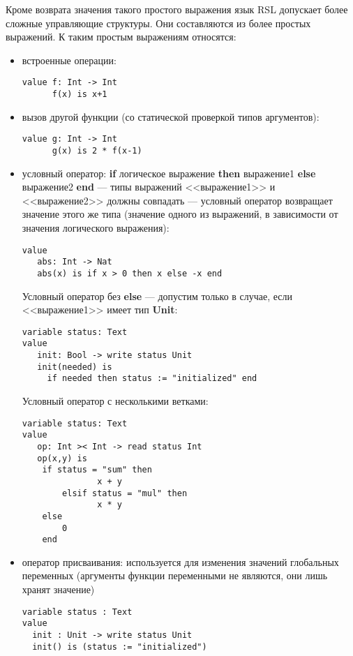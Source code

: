 \documentclass[14pt, twoside]{extreport}
\begin{document}
Кроме возврата значения такого простого выражения язык RSL допускает более сложные управляющие структуры. Они составляются из более простых выражений. К таким простым выражениям относятся:
\begin{itemize}
\item встроенные операции:
\begin{lstlisting}
value f: Int -> Int
      f(x) is x+1
\end{lstlisting}

\item вызов другой функции (со статической проверкой типов аргументов):
\begin{lstlisting}
value g: Int -> Int
      g(x) is 2 * f(x-1)
\end{lstlisting}

\item условный оператор: \textbf{if} логическое выражение \textbf{then} выражение1 \textbf{else} выражение2 \textbf{end} --- типы выражений <<выражение1>> и <<выражение2>> должны совпадать --- условный оператор возвращает значение этого же типа (значение одного из выражений, в зависимости от значения логического выражения):
\begin{lstlisting}
value
   abs: Int -> Nat
   abs(x) is if x > 0 then x else -x end  
\end{lstlisting}

Условный оператор без \textbf{else} --- допустим только в случае, если <<выражение1>> имеет тип \textbf{Unit}:
\begin{lstlisting}
variable status: Text
value
   init: Bool -> write status Unit
   init(needed) is
     if needed then status := "initialized" end
\end{lstlisting}

Условный оператор с несколькими ветками:
\begin{lstlisting}
variable status: Text
value
   op: Int >< Int -> read status Int
   op(x,y) is
	if status = "sum" then
               x + y
        elsif status = "mul" then
               x * y
	else
		0
	end
\end{lstlisting}

\item оператор присваивания: используется для изменения значений глобальных переменных (аргументы функции переменными не являются, они лишь хранят значение)
\begin{lstlisting}
variable status : Text
value
  init : Unit -> write status Unit
  init() is (status := "initialized")	
\end{lstlisting}


\end{itemize}
\end{document}
